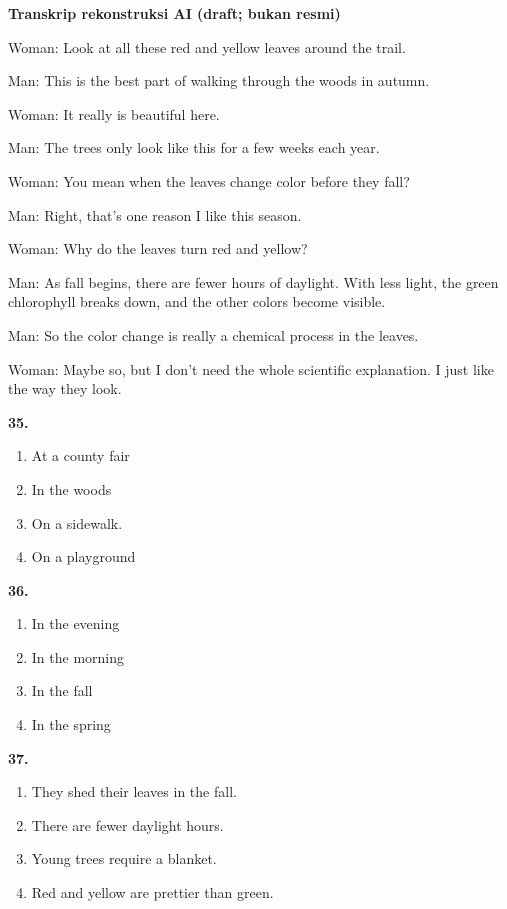 \documentclass[12pt]{article}
\begin{document}
\begin{exampleblock}
\textbf{Transkrip rekonstruksi AI (draft; bukan resmi)}\par
Woman: Look at all these red and yellow leaves around the trail.\par
Man: This is the best part of walking through the woods in autumn.\par
Woman: It really is beautiful here.\par
Man: The trees only look like this for a few weeks each year.\par
Woman: You mean when the leaves change color before they fall?\par
Man: Right, that's one reason I like this season.\par
Woman: Why do the leaves turn red and yellow?\par
Man: As fall begins, there are fewer hours of daylight. With less light, the green chlorophyll breaks down, and the other colors become visible.\par
Man: So the color change is really a chemical process in the leaves.\par
Woman: Maybe so, but I don't need the whole scientific explanation. I just like the way they look.\par
\end{exampleblock}
\noindent\textbf{35.}
\begin{enumerate}[label=(\Alph*),leftmargin=*,itemsep=0.2em]
\item At a county fair
\item In the woods
\item On a sidewalk.
\item On a playground
\end{enumerate}
\par
\vspace{0.25\baselineskip}
\noindent\textbf{36.}
\begin{enumerate}[label=(\Alph*),leftmargin=*,itemsep=0.2em]
\item In the evening
\item In the morning
\item In the fall
\item In the spring
\end{enumerate}
\par
\vspace{0.25\baselineskip}
\noindent\textbf{37.}
\begin{enumerate}[label=(\Alph*),leftmargin=*,itemsep=0.2em]
\item They shed their leaves in the fall.
\item There are fewer daylight hours.
\item Young trees require a blanket.
\item Red and yellow are prettier than green.
\end{enumerate}
\end{document}

